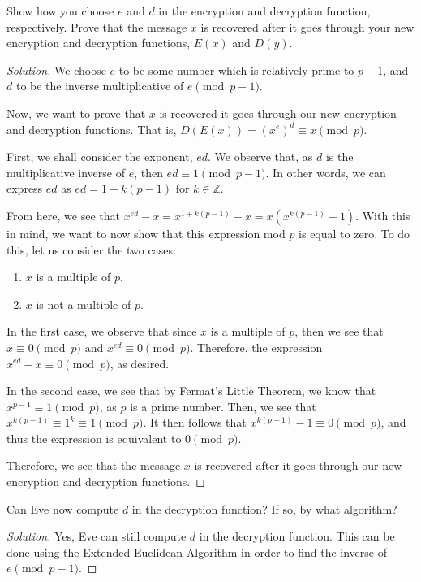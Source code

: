 \documentclass{article}
\newenvironment{solution}{\begin{proof}[Solution]}{\end{proof}}
\newcommand{\ZZ}{\mathbb{Z}}
\begin{document}
\begin{hw}
	Show how you choose $e$ and $d$ in the encryption and decryption function, respectively. Prove that the message $x$ is recovered after it goes through your new encryption and decryption functions, $E(x)$ and $D(y)$.
\end{hw}
\begin{solution}
	We choose $e$ to be some number which is relatively prime to $p-1$, and $d$ to be the inverse multiplicative of $e \pmod{p-1}$.
	
	Now, we want to prove that $x$ is recovered it goes through our new encryption and decryption functions. That is, $D(E(x)) = (x^{e})^{d} \equiv x \pmod{p}$.
	
	First, we shall consider the exponent, $ed$. We observe that, as $d$ is the multiplicative inverse of $e$, then $ed \equiv 1 \pmod{p-1}$. In other words, we can express $ed$ as $ed = 1 + k(p-1)$ for $k \in \ZZ$.
	
	From here, we see that $x^{ed} - x = x^{1 + k(p-1)} - x = x(x^{k(p-1)} - 1)$. With this in mind, we want to now show that this expression mod $p$ is equal to zero. To do this, let us consider the two cases:
	\begin{enumerate}
		\item $x$ is a multiple of $p$.
		\item $x$ is not a multiple of $p$.
	\end{enumerate}

	In the first case, we observe that since $x$ is a multiple of $p$, then we see that $x \equiv 0 \pmod{p}$ and $x^{ed} \equiv 0 \pmod{p}$. Therefore, the expression $x^{ed} - x \equiv 0 \pmod{p}$, as desired.
	
	In the second case, we see that by Fermat's Little Theorem, we know that $x^{p-1} \equiv 1 \pmod{p}$, as $p$ is a prime number. Then, we see that $x^{k(p-1)} \equiv 1^{k} \equiv 1 \pmod{p}$. It then follows that $x^{k(p-1)} - 1 \equiv 0 \pmod{p}$, and thus the expression is equivalent to $0 \pmod{p}$.
	
	Therefore, we see that the message $x$ is recovered after it goes through our new encryption and decryption functions.
\end{solution}

\begin{hw}
	Can Eve now compute $d$ in the decryption function? If so, by what algorithm?
\end{hw}
\begin{solution}
	Yes, Eve can still compute $d$ in the decryption function. This can be done using the Extended Euclidean Algorithm in order to find the inverse of $e \pmod{p-1}$.
\end{solution}
\end{document}
